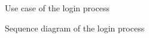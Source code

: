 \documentclass[12pt,titlepage]{article}
\begin{document}
\pagebreak
\begin{figure}
\centering
{}
\caption{Use case of the login process}

\end{figure}
\begin{figure}
\centering
{} 
\caption{Sequence diagram of the login process}
\end{figure}
\end{document}
